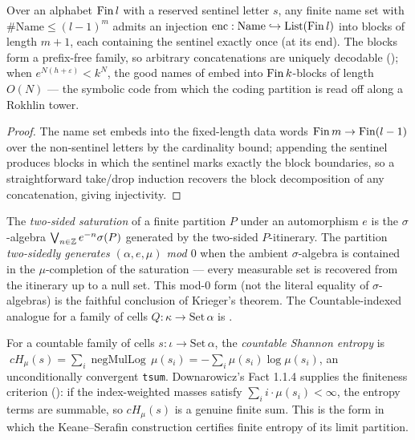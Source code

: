 \begin{theorem}\label{exists_sentinelEncoding}
  \leanok
  Over an alphabet \(\operatorname{Fin} l\) with a reserved sentinel letter \(s\), any finite name set with
  \(\#\mathrm{Name} \le (l-1)^m\) admits an injection
  \(\mathrm{enc} : \mathrm{Name} \hookrightarrow \mathrm{List}(\operatorname{Fin} l)\) into blocks of length
  \(m+1\), each containing the sentinel exactly once (at its end). The blocks form a prefix-free
  family, so arbitrary concatenations are uniquely decodable
  (); when
  \(e^{N(h+\varepsilon)} < k^{N}\), the good names of  embed into
  \(\operatorname{Fin} k\)-blocks of length \(O(N)\) --- the symbolic code from which the coding partition is
  read off along a Rokhlin tower.
\end{theorem}
\begin{proof}\leanok
  The name set embeds into the fixed-length data words \(\operatorname{Fin} m \to \operatorname{Fin}(l-1)\) over the
  non-sentinel letters by the cardinality bound; appending the sentinel produces blocks in which
  the sentinel marks exactly the block boundaries, so a straightforward take/drop induction
  recovers the block decomposition of any concatenation, giving injectivity.
\end{proof}

\begin{definition}\label{IsGeneratingTwoSidedMod0}
  \leanok
  The \emph{two-sided saturation}  of a finite partition
  \(P\) under an automorphism \(e\) is the \(\sigma\)-algebra
  \(\bigvee_{n\in\mathbb{Z}} e^{-n}\sigma(P)\) generated by the two-sided \(P\)-itinerary. The partition
  \emph{two-sidedly generates \((\alpha, e, \mu)\) mod \(0\)} when the ambient \(\sigma\)-algebra
  is contained in the \(\mu\)-completion of the saturation --- every measurable set is recovered
  from the itinerary up to a null set. This mod-\(0\) form (not the literal equality of
  \(\sigma\)-algebras) is the faithful conclusion of Krieger's theorem. The
  \(\mathrm{Countable}\)-indexed analogue for a family of cells \(Q : \kappa \to
  \mathrm{Set}\,\alpha\) is .
\end{definition}

\begin{definition}\label{cHmu}
  \leanok
  For a countable family of cells \(s : \iota \to \mathrm{Set}\,\alpha\), the \emph{countable
  Shannon entropy} is
  \(\;c H_\mu(s) = \sum_i \operatorname{negMulLog}\,\mu(s_i)
    = -\sum_i \mu(s_i)\log\mu(s_i)\),
  an unconditionally convergent \texttt{tsum}. Downarowicz's Fact 1.1.4 supplies the finiteness
  criterion (): if the
  index-weighted masses satisfy \(\sum_i i\cdot\mu(s_i) < \infty\), the entropy terms are
  summable, so \(cH_\mu(s)\) is a genuine finite sum. This is the form in which the
  Keane--Serafin construction certifies finite entropy of its limit partition.
\end{definition}

